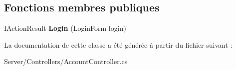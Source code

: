 \subsection*{Fonctions membres publiques}
\begin{DoxyCompactItemize}
\item 
\mbox{\label{class_mediwatch_1_1_server_1_1_controllers_1_1_account_controller_ae0987421b95c0e3e3acd11394684dcef}} 
I\+Action\+Result {\bfseries Login} (Login\+Form login)
\end{DoxyCompactItemize}


La documentation de cette classe a été générée à partir du fichier suivant \+:\begin{DoxyCompactItemize}
\item 
Server/\+Controllers/Account\+Controller.\+cs\end{DoxyCompactItemize}
